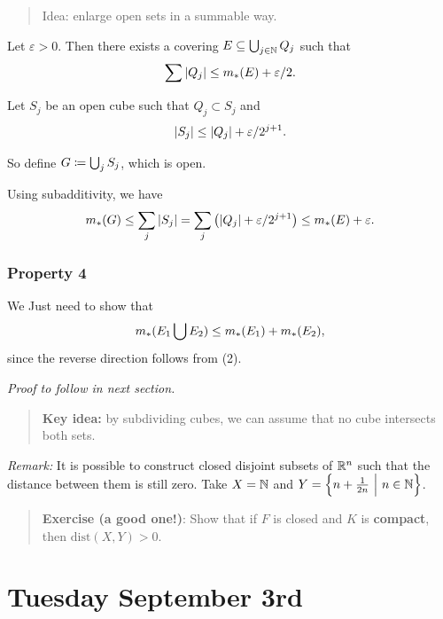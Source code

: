 \begin{quote}
Idea: enlarge open sets in a summable way.
\end{quote}

Let \(\varepsilon > 0\). Then there exists a covering
\(E \subseteq \bigcup_{j\in {\mathbb{N}}} Q_j\) such that
\begin{align*}
\sum {\left\lvert {Q_j} \right\rvert} \leq m_*(E) + \varepsilon/2
.\end{align*}

Let \(S_j\) be an open cube such that \(Q_j \subset S_j\) and
\begin{align*}
{\left\lvert {S_j} \right\rvert} \leq {\left\lvert {Q_j} \right\rvert} + \varepsilon/2^{j+1}
.\end{align*}

So define \(G \coloneqq \bigcup_j S_j\), which is open.

Using subadditivity, we have
\begin{align*}
m_*(G) \leq \sum_j {\left\lvert {S_j} \right\rvert} = \sum_j \left( {\left\lvert {Q_j} \right\rvert} + \varepsilon/2^{j+1} \right) \leq m_*(E) + \varepsilon.
\end{align*}

\hypertarget{property-4}{%
\subsubsection{Property 4}\label{property-4}}

We Just need to show that
\begin{align*}
m_*(E_1 \bigcup E_2) \leq m_*(E_1) + m_*(E_2)
,\end{align*} since the reverse direction follows from (2).

\emph{Proof to follow in next section.}

\begin{quote}
\textbf{Key idea:} by subdividing cubes, we can assume that no cube
intersects both sets.
\end{quote}

\emph{Remark:} It is possible to construct closed disjoint subsets of
\({\mathbb{R}}^n\) such that the distance between them is still zero. Take
\(X = {\mathbb{N}}\) and \(Y = \left\{{n + \frac 1 {2n} {~\mathrel{\Big|}~} n \in {\mathbb{N}}}\right\}\).

\begin{quote}
\textbf{Exercise (a good one!)}: Show that if \(F\) is closed and \(K\)
is \textbf{compact}, then \(\mathrm{dist}(X, Y) > 0\).
\end{quote}

\hypertarget{tuesday-september-3rd}{%
\section{Tuesday September 3rd}\label{tuesday-september-3rd}}

